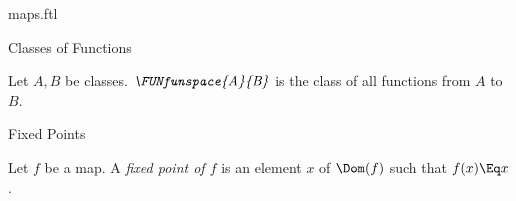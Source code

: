 \documentclass{stex}
\begin{document}
\begin{smodule}{maps.ftl}
\begin{sfragment}{Classes of Functions}
  \begin{definition}[forthel,for=FUNfunspace]
    Let $A, B$ be classes.
    $\emph{\FUNfunspace{A}{B}}$ is the class of all functions from $A$ to $B$.
  \end{definition}
\end{sfragment}

\begin{sfragment}{Fixed Points}
  \begin{definition}[forthel,for=fixed point]
    Let $f$ be a map.
    A \emph{fixed point of $f$} is an element $x$ of $\Dom(f)$ such that $f(x) \Eq x$.
  \end{definition}
\end{sfragment}
\end{smodule}
\end{document}

